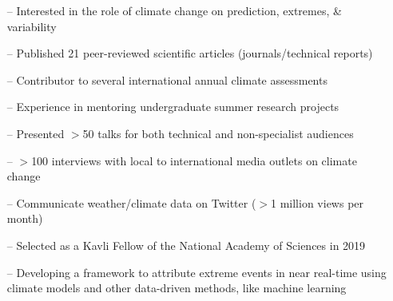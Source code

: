 \documentclass[10pt,a4paper]{altacv}
\begin{document}

%

\begin{fullwidth}
\makecvheader
\end{fullwidth}

%

\vspace{-0.09in}
\begin{itemize}
    \setlength{\itemindent}{0.5em}
    \item[--] \small{Interested in the role of climate change on prediction, extremes, \& variability}
    \item[--] \small{Published 21 peer-reviewed scientific articles (journals/technical reports)}
    \item[--] \small{Contributor to several international annual climate assessments}
    \item[--] \small{Experience in mentoring undergraduate summer research projects}
    \item[--] \small{Presented $>$50 talks for both technical and non-specialist audiences}
    \item[--] \small{$>$100 interviews with local to international media outlets on climate change}
    \item[--] \small{Communicate weather/climate data on Twitter ($>$1 million views per month)}
    \item[--] \small{Selected as a Kavli Fellow of the National Academy of Sciences in 2019}
\end{itemize}
\medskip



\begin{itemize}
    \setlength{\itemindent}{0.5em}
    \item[--]   \small{Developing a framework to attribute extreme events in near real-time using climate models and other data-driven methods, like machine learning}
\end{itemize}
\medskip
\end{document}
